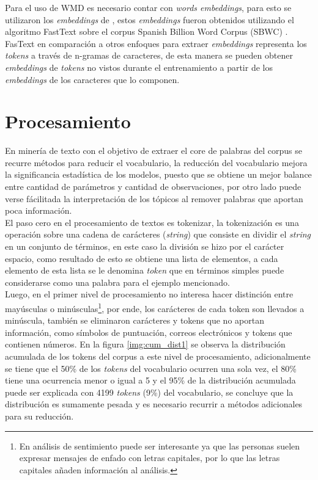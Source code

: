 \documentclass[letterpaper,12pt,oneside]{book} %
\begin{document}
Para el uso de WMD es necesario contar con \textit{words embeddings}, para esto se utilizaron los \textit{embeddings} de \citep{fastextSBWC}, estos \textit{embeddings} fueron obtenidos utilizando el algoritmo FastText \citep{bojanowski2017enriching} sobre el corpus Spanish Billion Word Corpus (SBWC) \citep{cardellinoSBWCE}. FasText en comparación a otros enfoques para extraer \textit{embeddings} representa los \textit{tokens} a través de n-gramas de caracteres, de esta manera se pueden obtener \textit{embeddings} de \textit{tokens} no vistos durante el entrenamiento a partir de los \textit{embeddings} de los caracteres que lo componen.

\section{Procesamiento}

En minería de texto con el objetivo de extraer el core de palabras del corpus se recurre métodos para reducir el vocabulario, la reducción del vocabulario mejora la significancia estadística de los modelos, puesto que se obtiene un mejor balance entre cantidad de parámetros y cantidad de observaciones, por otro lado puede verse fácilitada la interpretación de los tópicos al remover palabras que aportan poca información. \\

El paso cero en el procesamiento de textos es tokenizar, la tokenización es una operación sobre una cadena de carácteres (\textit{string}) que consiste en dividir el \textit{string} en un conjunto de términos, en este caso la división se hizo por el carácter espacio, como resultado de esto se obtiene una lista de elementos, a cada elemento de esta lista se le denomina \textit{token} que en términos simples puede considerarse como una palabra para el ejemplo mencionado. \\

Luego, en el primer nivel de procesamiento no interesa hacer distinción entre mayúsculas o minúsculas\footnote{En análisis de sentimiento puede ser interesante ya que las personas suelen expresar mensajes de enfado con letras capitales, por lo que las letras capitales añaden información al análisis.}, por ende, los carácteres de cada token son llevados a minúscula, también se eliminaron carácteres y tokens que no aportan información, como símbolos de puntuación, correos electrónicos y tokens que contienen números. En la figura \ref{img:cum_dist1} se observa la distribución acumulada de los tokens del corpus a este nivel de procesamiento, adicionalmente se tiene que el 50\% de los \textit{tokens} del vocabulario ocurren una sola vez, el 80\% tiene una ocurrencia menor o igual a 5 y el 95\% de la distribución acumulada puede ser explicada con 4199 \textit{tokens} (9\%) del vocabulario, se concluye que la distribución es sumamente pesada y es necesario recurrir a métodos adicionales para su reducción. \\
\end{document}
